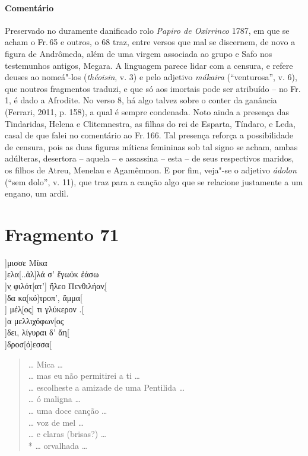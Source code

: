 \pagebreak
{\paragraph{Comentário} Preservado no duramente danificado rolo \textit{Papiro de Oxirrinco} 1787, em que se acham o Fr.\,65 e outros, o 68 traz, entre versos que mal se discernem, de novo a figura de Andrômeda, além de uma virgem associada ao grupo e Safo nos testemunhos antigos, Megara.  A linguagem parece lidar com a censura, e refere deuses ao nomeá"-los (\textit{théoisin}, v. 3) e pelo adjetivo \textit{mákaira} (``venturosa'', v. 6), que noutros fragmentos traduzi, e que só aos imortais pode ser atribuído -- no Fr.\,1, é dado a Afrodite. No verso 8, há algo talvez sobre o conter da ganância (Ferrari, 2011, p. 158), a qual é sempre condenada. Noto ainda a presença das Tindaridas, Helena e Clitemnestra, as filhas do rei de Esparta, Tíndaro, e Leda, casal de que falei no comentário ao Fr.\,166. Tal presença reforça a possibilidade de censura, pois as duas figuras míticas femininas sob tal signo se acham, ambas adúlteras, desertora -- aquela -- e assassina -- esta -- de seus respectivos maridos, os filhos de Atreu, Menelau e Agamêmnon. E por fim, veja"-se o adjetivo \textit{ádolon} (``sem dolo'', v. 11), que traz para a canção algo que se relacione justamente a um engano, um ardil.}



\pagebreak
\section{Fragmento 71}

\begin{gkverse}
]μισσε Μίκα\\
]ελα[..ἀλ]λά σ’ ἔγωὐκ ἐάσω\\
         ]ν̣ φιλότ[ατ’] ἤλεο Πενθιλήαν̣[\\
]δα κα̣[κό]τροπ’, ἄμμα[\\
    ] μέλ̣[ος] τι γλύκερον .[\\
    ]α μελλιχόφων[ος\\
    ]δει, λίγυραι δ’ ἄη[\\
        ]δροσ[ό]εσσα[
\end{gkverse}

\begin{verse}
\ldots{} Mica \ldots{}\\
\ldots{} mas eu não permitirei a ti \ldots{}\\
\ldots{} escolheste a amizade de uma Pentilida \ldots{}\\
\ldots{} ó maligna \ldots{}\\
\ldots{} uma doce canção \ldots{}\\
\ldots{} voz de mel \ldots{}\\
\ldots{} e claras (brisas?) \ldots{}\\*
\ldots{} orvalhada \ldots{}
\end{verse}

